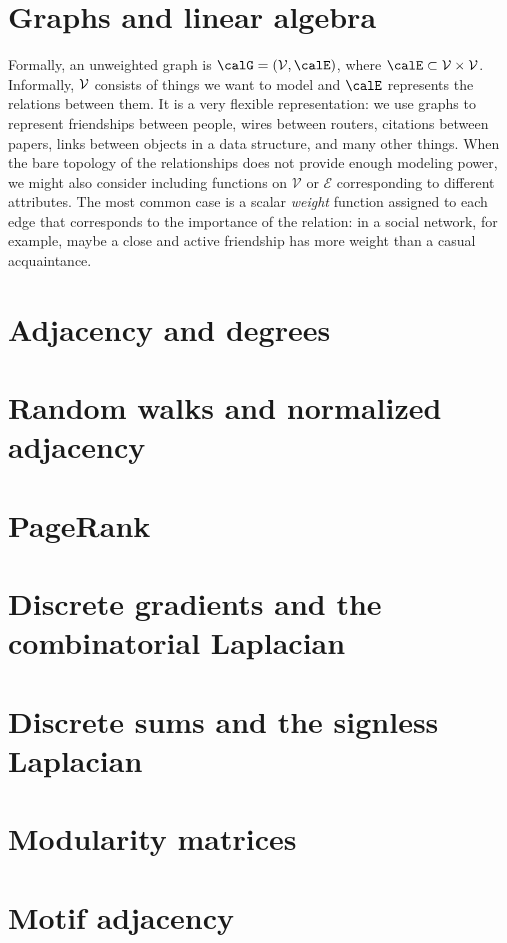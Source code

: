 \documentclass[12pt, leqno]{article} %
\begin{document}

\section{Graphs and linear algebra}

Formally, an unweighted graph is
$\calG = (\calV, \calE)$,
where $\calE \subset \calV \times \calV$.
Informally, $\mathcal{V}$ consists of things we want to model and $\calE$
represents the relations between them.
It is a very flexible representation: we use graphs to represent
friendships between people, wires between routers, citations between
papers, links between objects in a data structure, and many other things.
When the bare topology of the relationships does not provide enough
modeling power, we might also consider including functions on
$\mathcal{V}$ or $\mathcal{E}$ corresponding to different attributes.
The most common case is a scalar {\em weight} function
assigned to each edge that corresponds to the importance of the
relation: in a social network, for example, maybe a close and
active friendship has more weight than a casual acquaintance.

\section{Adjacency and degrees}

\section{Random walks and normalized adjacency}

\section{PageRank}

\section{Discrete gradients and the combinatorial Laplacian}

\section{Discrete sums and the signless Laplacian}

\section{Modularity matrices}

\section{Motif adjacency}
\end{document}
